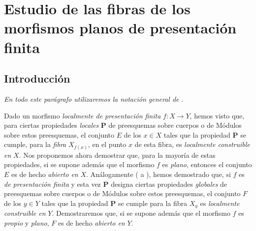 
\section{Estudio de las fibras de los morfismos planos de presentación finita}
\label{section:IV.12}

\setcounter{subsection}{-1}
\subsection{Introducción}
\label{subsection:IV.12.0}

\emph{En todo este parágrafo utilizaremos la notación general de} .

\begin{env}[12.0.1]
\label{IV.12.0.1}
Dado un morfismo \emph{localmente de presentación finita} $f:X\to Y$, hemos visto  que, para ciertas propiedades \emph{locales} $\boldsymbol{P}$ de preesquemas sobre cuerpos o de Módulos sobre estos preesquemas, el conjunto $E$ de los $x\in X$ tales que la propiedad $\boldsymbol{P}$ se cumple, para la \emph{fibra} $X_{f(x)}$, en el punto $x$ de esta fibra, es \emph{localmente construible en} $X$.
Nos proponemos ahora demostrar que, para la mayoría de estas propiedades, si se supone además que el morfismo $f$ es \emph{plano}, entonces el conjunto $E$ es de hecho \emph{abierto en} $X$.
Análogamente ( a ), hemos demostrado que, si $f$ es \emph{de presentación finita} y esta vez $\boldsymbol{P}$ designa ciertas propiedades \emph{globales} de preesquemas sobre cuerpos o de Módulos sobre estos preesquemas, el conjunto $F$ de los $y\in Y$ tales que la propiedad $\boldsymbol{P}$ se cumple para la fibra $X_y$ es \emph{localmente construible en} $Y$.
Demostraremos que, si se supone además que el morfismo $f$ es \emph{propio} y \emph{plano}, $F$ es de hecho \emph{abierto en} $Y$.
\end{env}

